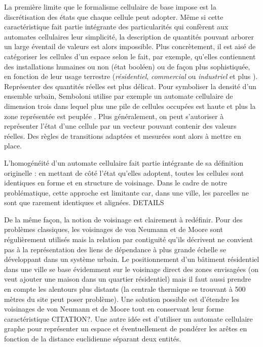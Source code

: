 \documentclass[10pt]{article}
\begin{document}
\begin{multicols}{2}
La première limite que le formalisme cellulaire de base impose est la
discrétisation des états que chaque cellule peut adopter. Même si
cette caractéristique fait partie intégrante des particularités qui
confèrent aux automates cellulaires leur simplicité, la description de
quantités pouvant arborer un large éventail de valeurs est alors
impossible. Plus concrètement, il est aisé de catégoriser les cellules
d'un espace selon le fait, par exemple, qu'elles contiennent des
installations humaines ou non (état booléen)
\cite{Benguigui2004,Cornu} ou de façon plus sophistiquée, en fonction
de leur usage terrestre (\textit{résidentiel}, \textit{commercial} ou
\textit{industriel} \cite{Lechner} et plus
\cite{Dubos-Paillard203}). Représenter des quantités réelles est plus
délicat. Pour symboliser la densité d'un ensemble urbain, Semboloni
utilise par exemple un automate cellulaire de dimension trois dans
lequel plus une pile de cellules occupées est haute et plus la zone
représentée est peuplée \cite{Semboloni2000}. Plus généralement, on
peut s'autoriser à représenter l'état d'une cellule par un vecteur
pouvant contenir des valeurs réelles. Des règles de transitions
adaptées et mesurées sont alors à mettre en place.

L'homogénéité d'un automate cellulaire fait partie intégrante de sa
définition originelle : en mettant de côté l'état qu'elles adoptent,
toutes les cellules sont identiques en forme et en structure de
voisinage. Dans le cadre de notre problématique, cette approche est
limitante car, dans une ville, les parcelles ne sont que rarement
identiques et alignées. DETAILS

De la même façon, la notion de voisinage est clairement à
redéfinir. Pour des problèmes classiques, les voisinages de von
Neumann et de Moore sont régulièrement utilisés mais la relation par
contiguité qu'ils décrivent ne convient pas à la représentation des
liens de dépendance à plus grande échelle se développant dans un
système urbain. Le positionnement d'un bâtiment résidentiel dans une
ville se base évidemment sur le voisinage direct des zones envisagées
(on veut ajouter une maison dans un quartier résidentiel) mais il faut
aussi prendre en compte les alentours plus distants (la centrale
thermique se trouvant à 500 mètres du site peut poser problème). Une
solution possible est d'étendre les voisinages de von Neumann et de
Moore tout en conservant leur forme caractéristique CITATION?. Une
autre idée est d'utiliser un automate cellulaire graphe pour
représenter un espace \cite{0'Sullivan2001} et éventuellement de
pondérer les arêtes en fonction de la distance euclidienne séparant
deux entités.


\end{multicols}
\end{document}
